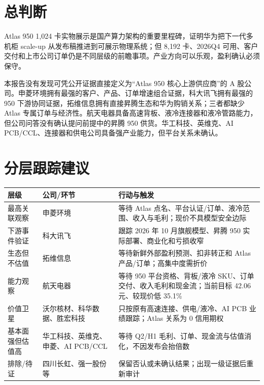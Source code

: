 \section{总判断}

Atlas 950 1,024 卡实物展示是国产算力架构的重要里程碑，证明华为把下一代多机柜 scale-up 从发布稿推进到可展示物理系统；但 8,192 卡、2026Q4 可用、客户交付和上市公司订单仍是不同层级的前瞻事项。产业方向可以乐观，盈利确认必须保守。

本报告没有发现可凭公开证据直接定义为“Atlas 950 核心上游供应商”的 A 股公司。申菱环境拥有最强的客户、产品、订单增速组合证据，科大讯飞拥有最强的 950 下游协同证据，拓维信息拥有直接昇腾生态和华为购销关系；三者都缺少 Atlas 专属订单与经济性。航天电器具备高速背板、液冷连接器和液冷管路能力，但公司问答没有确认提问前提中的昇腾 950 供货。华工科技、英维克、AI PCB/CCL、连接器和供电公司具备强产业能力，但平台关系未确认。

\section{分层跟踪建议}

\begin{exhibitbox}[研究动作清单]
\begin{tabularx}{\textwidth}{L{3.0cm}L{3.8cm}X}
\toprule
\textbf{层级} & \textbf{公司/环节} & \textbf{行动与触发}\\
\midrule
最高关联观察 & 申菱环境 & 等待 Atlas 点名、平台认证/订单、液冷范围、收入与毛利；现价不具模型安全边际\\
下游事件验证 & 科大讯飞 & 跟踪 2026 年 10 月旗舰模型、昇腾 950 实际部署、商业化和亏损收窄\\
生态但不估值 & 拓维信息 & 等待新鲜外部盈利预测、扣非转正和 Atlas 产品/订单；高集中度需折价\\
能力观察 & 航天电器 & 等待 950 平台资格、背板/液冷 SKU、订单交付、收入毛利和现金流；当前目标 42.06 元、较现价低 35.1\%\\
价值卫星 & 沃尔核材、科华数据、胜宏科技 & 只按原有高速连接、供电/液冷、AI PCB 业绩跟踪；Atlas 关系为 0 信用期权\\
基本面强但估值高 & 华工科技、英维克、申菱、AI PCB/CCL & 等待 Q2/H1 毛利、订单、现金流与估值消化，不因发布会抬倍数\\
排除/待证 & 四川长虹、强一股份等 & 保留否认或未确认结果；出现一级证据后重新审计\\
\bottomrule
\end{tabularx}
\end{exhibitbox}

